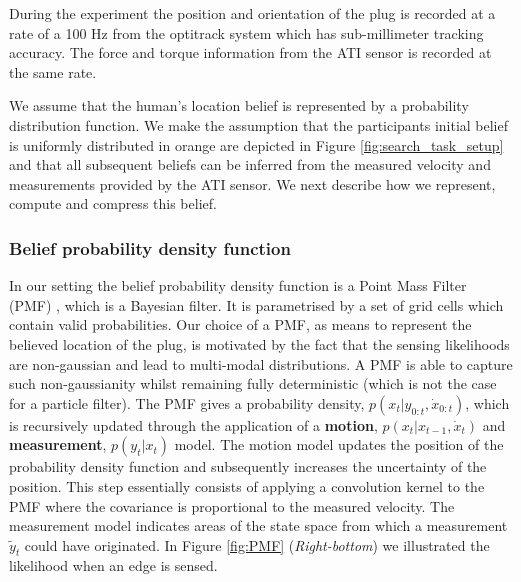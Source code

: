During the experiment the position and orientation of the plug is recorded at a rate of a 100 Hz
from the optitrack system which has sub-millimeter tracking accuracy. The force and torque information 
from the ATI sensor is recorded at the same rate. 

We assume that the human's location belief is represented by a probability distribution function. We make
the assumption that the participants initial belief is uniformly distributed in orange are depicted in 
Figure \ref{fig:search_task_setup} and that all subsequent beliefs can be inferred from the measured velocity 
and measurements provided by the ATI sensor. We next describe how we represent, compute and compress this 
belief.

\subsubsection{Belief probability density function}
In our setting the belief probability density function is a Point Mass Filter (PMF) \cite[p.87]{Bergman99recursivebayesian},
which is a  Bayesian filter. It is parametrised by a set of grid cells  which contain valid probabilities.
Our choice of a PMF, as means to represent the believed location of the plug, is motivated by the fact that the 
sensing likelihoods are non-gaussian and lead to multi-modal distributions. A PMF is able to capture such non-gaussianity whilst
remaining fully deterministic (which is not the case for a particle filter).
The PMF gives a probability density, $p(x_t|y_{0:t},\dot{x}_{0:t})$, which is recursively updated through the 
application of a \textbf{motion}, $p(x_t|x_{t-1},\dot{x}_t)$ and \textbf{measurement}, $p(y_t|x_t)$ model. 
The motion model updates the position of the probability density function and subsequently increases the uncertainty 
of the position. This step essentially consists of applying a convolution kernel to the PMF where the covariance 
is proportional to the measured velocity.
The measurement model indicates areas of the state space from which a measurement $\tilde{y}_t$ could have originated. 
In Figure \ref{fig:PMF} (\textit{Right-bottom}) we illustrated the likelihood when an edge is sensed.

